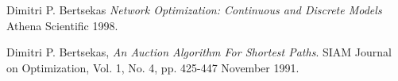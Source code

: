 \documentclass {article}
\begin{document}
\begin{thebibliography}{9}

        Dimitri P. Bertsekas
        \emph{Network Optimization: Continuous and Discrete Models}
        Athena Scientific
        1998.

        Dimitri P. Bertsekas,
        \emph{An Auction Algorithm For Shortest Paths}.
        SIAM Journal on Optimization,
        Vol. 1, No. 4, pp. 425-447
        November 1991.
      
\end{thebibliography}
\end{document}
